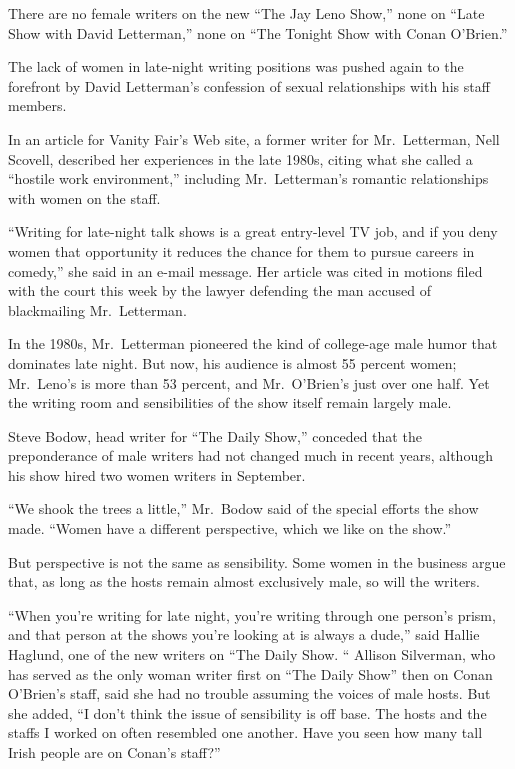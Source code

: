 ﻿\documentclass[12pt]{article}
\begin{document}
There are no female writers on the new ``The Jay Leno Show,'' none on ``Late Show with David
Letterman,'' none on ``The Tonight Show with Conan O'Brien.''

The lack of women in late-night writing positions was pushed again to the forefront by David
Letterman's confession of sexual relationships with his staff members.

In an article for Vanity Fair's Web site, a former writer for Mr.~Letterman, Nell Scovell, described
her experiences in the late 1980s, citing what she called a ``hostile work environment,'' including
Mr.~Letterman's romantic relationships with women on the staff.

``Writing for late-night talk shows is a great entry-level TV job, and if you deny women that
opportunity it reduces the chance for them to pursue careers in comedy,'' she said in an e-mail
message. Her article was cited in motions filed with the court this week by the lawyer defending the
man accused of blackmailing Mr.~Letterman.

In the 1980s, Mr.~Letterman pioneered the kind of college-age male humor that dominates late night.
But now, his audience is almost 55 percent women; Mr.~Leno's is more than 53 percent, and
Mr.~O'Brien's just over one half. Yet the writing room and sensibilities of the show itself remain
largely male.

Steve Bodow, head writer for ``The Daily Show,'' conceded that the preponderance of male writers had
not changed much in recent years, although his show hired two women writers in September.

``We shook the trees a little,'' Mr.~Bodow said of the special efforts the show made. ``Women have a
different perspective, which we like on the show.''

But perspective is not the same as sensibility. Some women in the business argue that, as long as
the hosts remain almost exclusively male, so will the writers.

``When you're writing for late night, you're writing through one person's prism, and that person at
the shows you're looking at is always a dude,'' said Hallie Haglund, one of the new writers on ``The
Daily Show. `` Allison Silverman, who has served as the only woman writer first on ``The Daily
Show'' then on Conan O'Brien's staff, said she had no trouble assuming the voices of male hosts. But
she added, ``I don't think the issue of sensibility is off base. The hosts and the staffs I worked
on often resembled one another. Have you seen how many tall Irish people are on Conan's staff?''
\end{document}
